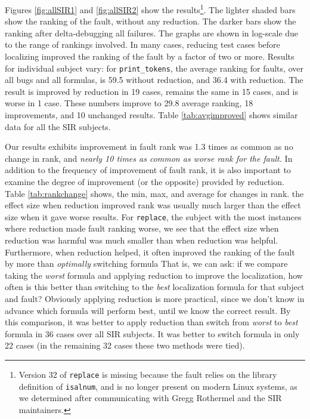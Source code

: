 Figures \ref{fig:allSIR1} and \ref{fig:allSIR2} show the
results\footnote{Version 32 of {\tt replace} is missing because the
fault relies on the library definition of {\tt isalnum}, and is no
longer present on modern Linux systems, as we determined after
communicating with Gregg Rothermel and the SIR maintainers.}.  The
lighter shaded bars show the ranking of the fault, without any
reduction.  The darker bars show the ranking after delta-debugging all
failures.  The graphs are shown in log-scale due to the range of
rankings involved.  In many cases, reducing test cases before
localizing improved the ranking of the fault by a factor of two or
more.  Results for individual subject vary: for {\tt print\_tokens},
the average ranking for faults, over all bugs and all formulas, is
59.5 without reduction, and 36.4 with reduction.  The result is
improved by reduction in 19 cases, remains the same in 15 cases, and
is worse in 1 case.  These numbers improve to 29.8 average ranking, 18
improvements, and 10 unchanged results.
Table \ref{tab:avgimproved} shows similar data for all the SIR
subjects.  

Our results exhibits improvement in fault rank was 1.3 times as common as no change
in rank, and \emph{nearly 10 times as common as worse rank for the
fault.}  In addition to the frequency of improvement of fault rank, it
is also important to examine the degree of improvement (or the
opposite) provided by reduction.  Table \ref{tab:rankchange} shows,
the min, max, and average for changes in rank.  the effect
size when reduction improved rank was usually much larger than the
effect size when it gave worse results.  For {\tt replace}, the
subject with the most instances where reduction made fault ranking
worse, we see that the effect size when reduction was harmful was much
smaller than when reduction was helpful.  Furthermore, when reduction
helped, it often improved the ranking of the fault by more than
\emph{optimally} switching formula  That is, we can ask: if we compare
taking the \emph{worst} formula and applying reduction to improve the
localization, how often is this better than switching to the
\emph{best} localization formula for that subject and fault?
Obviously applying reduction is more practical, since we don't know in
advance which formula will perform best, until we know the correct
result.  By this comparison, it was better to
apply reduction than switch from \emph{worst} to \emph{best} formula
in 36 cases over all SIR subjects.  It was better to switch formula in
only 22 cases (in the remaining 32 cases these two methods were tied).



